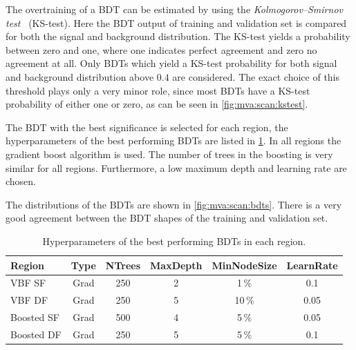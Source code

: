 The overtraining of a BDT can be estimated by using the \emph{Kolmogorov--Smirnov test}~\cite{KSk, KSs} (KS-test).
Here the BDT output of training and validation set is compared for both the signal and background distribution.
The KS-test yields a probability between zero and one, where one indicates perfect agreement and zero no agreement at all.
Only BDTs which yield a KS-test probability for both signal and background distribution above $0.4$ are considered. %
The exact choice of this threshold plays only a very minor role, since most BDTs have a KS-test probability of either one or zero,
as can be seen in \cref{fig:mva:scan:kstest}.

The BDT with the best significance is selected for each region, the hyperparameters of the best performing BDTs are
listed in \cref{tab:mva:bestparams}.
In all regions the gradient boost algorithm is used.
The number of trees in the boosting is very similar for all regions.
Furthermore, a low maximum depth and learning rate are chosen.

The distributions of the BDTs are shown in \cref{fig:mva:scan:bdts}.
There is a very good agreement between the BDT shapes of the training and validation set.

\begin{table}[htpb]
    \centering
    \caption{Hyperparameters of the best performing BDTs in each region.}\label{tab:mva:bestparams}
    \begin{tabular}{@{}lccccc@{}}
        \toprule
        Region     & Type & NTrees & MaxDepth & MinNodeSize & LearnRate \\ \midrule
        VBF SF     & Grad & 250    & 2        & 1\,\%       & 0.1          \\
        VBF DF     & Grad & 250    & 5        & 10\,\%      & 0.05         \\
        Boosted SF & Grad & 500    & 4        & 5\,\%       & 0.05         \\
        Boosted DF & Grad & 250    & 5        & 5\,\%       & 0.1          \\
        \bottomrule
    \end{tabular}
\end{table}


